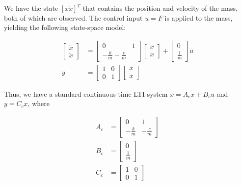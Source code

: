 \documentclass{article}
\begin{document}
We have the state $[x \dot{x}]^T$ that contains the position and velocity of the mass, both of which are observed.
The control input $u=F$ is applied to the mass, yielding the following state-space model:

$$
\begin{aligned}
  \begin{bmatrix}
    \dot{x} \\
    \ddot{x}
  \end{bmatrix} &=
  \begin{bmatrix}
    0 & 1 \\
    -\frac{k}{m}  -\frac{c}{m}
  \end{bmatrix}
  \begin{bmatrix}
    x \\
    \dot{x}
  \end{bmatrix} +
  \begin{bmatrix}
    0 \\
    \frac{1}{m}
  \end{bmatrix} u \\
  y &=
  \begin{bmatrix}
    1 & 0 \\
    0 & 1
  \end{bmatrix}
  \begin{bmatrix}
    x \\
    \dot{x}
  \end{bmatrix}
\end{aligned}
$$

Thus, we have a standard continuous-time LTI system $\dot{x} = A_cx + B_cu$ and $y = C_cx$, where

\begin{equation}
  \begin{aligned}
    A_c &=
    \begin{bmatrix}
      0 & 1 \\
      -\frac{k}{m} & -\frac{c}{m}
    \end{bmatrix} \\
    B_c &=
    \begin{bmatrix}
      0 \\
      \frac{1}{m}
    \end{bmatrix} \\
    C_c &=
    \begin{bmatrix}
      1 & 0 \\
      0 & 1
    \end{bmatrix}
  \end{aligned}
\end{equation}
\end{document}
